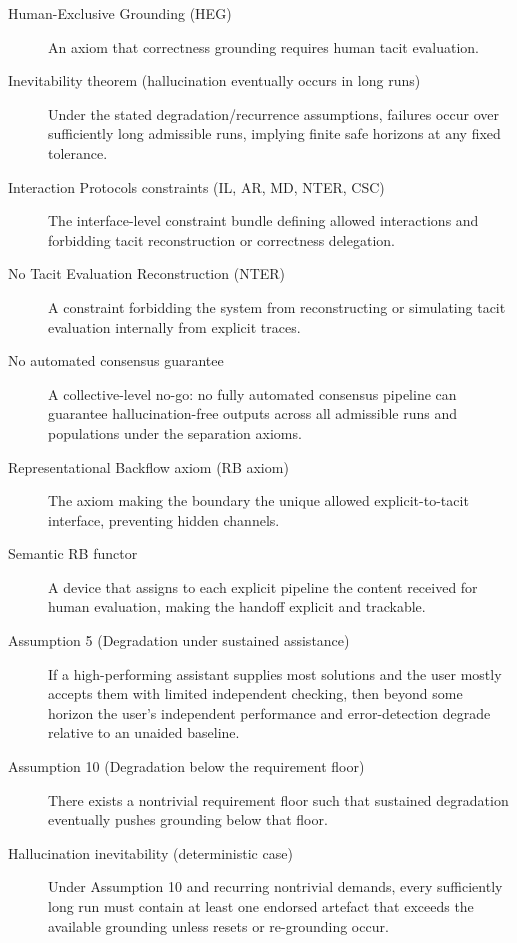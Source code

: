 \begin{description}
\item[Human-Exclusive Grounding (HEG)] An axiom that correctness grounding requires human tacit evaluation.

\item[Inevitability theorem (hallucination eventually occurs in long runs)] Under the stated degradation/recurrence assumptions, failures occur over sufficiently long admissible runs, implying finite safe horizons at any fixed tolerance.

\item[Interaction Protocols constraints (IL, AR, MD, NTER, CSC)] The interface-level constraint bundle defining allowed interactions and forbidding tacit reconstruction or correctness delegation.

\item[No Tacit Evaluation Reconstruction (NTER)] A constraint forbidding the system from reconstructing or simulating tacit evaluation internally from explicit traces.

\item[No automated consensus guarantee] A collective-level no-go: no fully automated consensus pipeline can guarantee hallucination-free outputs across all admissible runs and populations under the separation axioms.

\item[Representational Backflow axiom (RB axiom)] The axiom making the boundary the unique allowed explicit-to-tacit interface, preventing hidden channels.

\item[Semantic RB functor] A device that assigns to each explicit pipeline the content received for human evaluation, making the handoff explicit and trackable.

\end{description}

\begin{description}

\item[Assumption 5 (Degradation under sustained assistance)] If a high-performing assistant supplies most solutions and the user mostly accepts them with limited independent checking, then beyond some horizon the user’s independent performance and error-detection degrade relative to an unaided baseline.

\item[Assumption 10 (Degradation below the requirement floor)] There exists a nontrivial requirement floor such that sustained degradation eventually pushes grounding below that floor.

\item[Hallucination inevitability (deterministic case)] Under Assumption 10 and recurring nontrivial demands, every sufficiently long run must contain at least one endorsed artefact that exceeds the available grounding unless resets or re-grounding occur.

\end{description}
